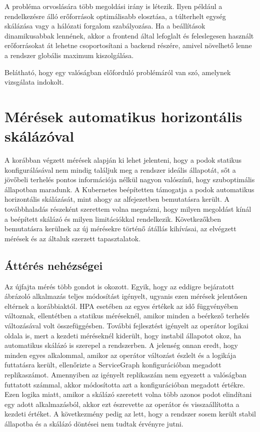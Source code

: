 A probléma orvoslására több megoldási irány is létezik. 
Ilyen például a rendelkezésre álló erőforrások optimálisabb elosztása, a túlterhelt egység skálázása vagy a hálózati forgalom szabályozása.
Ha a beállítások dinamikusabbak lennének, akkor a frontend által lefoglalt és feleslegesen használt erőforrásokat át lehetne csoportosítani a backend részére, amivel növelhető lenne a rendszer globális maximum kiszolgálása.

Belátható, hogy egy valóságban előforduló problémáról van szó, amelynek vizsgálata indokolt.

\section{Mérések automatikus horizontális skálázóval}

A korábban végzett mérések alapján ki lehet jelenteni, hogy a podok statikus konfigurálásával nem mindig találjuk meg a rendszer ideális állapotát,  sőt a jövőbeli terhelés pontos információja nélkül nagyon valószínű, hogy szuboptimális állapotban maradunk.
A Kubernetes beépítetten támogatja a podok automatikus horizontális skálázását, mint ahogy az  alfejezetben bemutatásra került.
A továbbhaladás részeként szerettem volna megnézni, hogy milyen megoldást kínál a beépített skálázó és milyen limitációkkal rendelkezik.
Következőkben bemutatásra kerülnek az új mérésekre történő átállás kihívásai, az elvégzett mérések és az általuk szerzett tapasztalatok.

\subsection{Áttérés nehézségei}
Az újfajta mérés több gondot is okozott. 
Egyik, hogy az eddigre bejáratott ábrázoló alkalmazás teljes módosítást igényelt, ugyanis ezen mérések jelentősen eltérnek a korábbiaktól.
HPA esetében az egyes értékek az idő függvényében változnak, ellentétben a statikus méréseknél, amikor minden a beérkező terhelés változásával volt összefüggésben.
További fejlesztést igényelt az operátor logikai oldala is, mert a kezdeti méréseknél kiderült, hogy instabil állapotot okoz, ha automatikus skálázó is szerepel a rendszerben. 
A jelenség onnan eredt, hogy minden egyes alkalommal, amikor az operátor változást észlelt és a logikája futtatásra került, ellenőrizte a ServiceGraph konfigurációban megadott replikaszámot. 
Amennyiben az igényelt replikaszám nem egyezett a valóságban futtatott számmal, akkor módosította azt a konfigurációban megadott értékre.
Ezen logika miatt, amikor a skálázó szeretett volna több azonos podot elindítani egy adott alkalmazásból, akkor ezt észrevette az operátor és visszaállította a kezdeti értéket.
A következmény pedig az lett, hogy a rendszer sosem került stabil állapotba és a skálázó döntései nem tudtak érvényre jutni.

